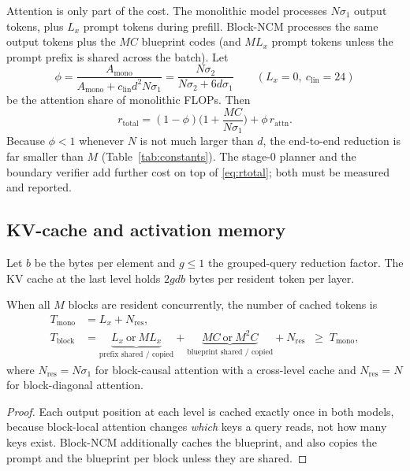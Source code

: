 Attention is only part of the cost. The monolithic model processes $N\sigma_1$
output tokens, plus $L_x$ prompt tokens during prefill. Block-NCM processes the
same output tokens plus the $MC$ blueprint codes (and $ML_x$ prompt tokens
unless the prompt prefix is shared across the batch). Let
\begin{equation}
  \phi=\frac{A_{\mathrm{mono}}}{A_{\mathrm{mono}}+c_{\mathrm{lin}}d^2N\sigma_1}
  =\frac{N\sigma_2}{N\sigma_2+6d\sigma_1}\qquad(L_x=0,\ c_{\mathrm{lin}}=24)
  \label{eq:phi}
\end{equation}
be the attention share of monolithic FLOPs. Then
\begin{equation}
  r_{\mathrm{total}}
  =(1-\phi)\Big(1+\frac{MC}{N\sigma_1}\Big)+\phi\,r_{\mathrm{attn}}.
  \label{eq:rtotal}
\end{equation}
Because $\phi<1$ whenever $N$ is not much larger than $d$, the end-to-end
reduction is far smaller than $M$ (Table~\ref{tab:constants}). The stage-0
planner and the boundary verifier add further cost on top of
\eqref{eq:rtotal}; both must be measured and reported.

\subsection{KV-cache and activation memory}

Let $b$ be the bytes per element and $g\le1$ the grouped-query reduction
factor. The KV cache at the last level holds $2gdb$ bytes per resident token
per layer.

\begin{proposition}
\label{prop:kv}
When all $M$ blocks are resident concurrently, the number of cached tokens is
\begin{align}
  T_{\mathrm{mono}}&=L_x+N_{\mathrm{res}},\\
  T_{\mathrm{block}}&=\underbrace{L_x\ \text{or}\ ML_x}_{\text{prefix shared / copied}}
  +\underbrace{MC\ \text{or}\ M^2C}_{\text{blueprint shared / copied}}
  +N_{\mathrm{res}}\;\;\ge\;T_{\mathrm{mono}},
\end{align}
where $N_{\mathrm{res}}=N\sigma_1$ for block-causal attention with a cross-level
cache and $N_{\mathrm{res}}=N$ for block-diagonal attention.
\end{proposition}

\begin{proof}
Each output position at each level is cached exactly once in both models,
because block-local attention changes \emph{which} keys a query reads, not how
many keys exist. Block-NCM additionally caches the blueprint, and also copies
the prompt and the blueprint per block unless they are shared.
\end{proof}

